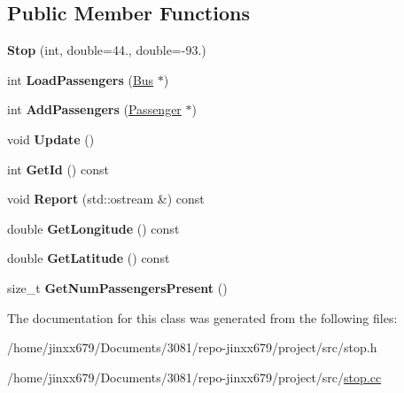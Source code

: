 \subsection*{Public Member Functions}
\begin{DoxyCompactItemize}
\item 
\mbox{\label{classStop_a59d881f072b1cf89512bb15a51ffc773}} 
{\bfseries Stop} (int, double=44., double=-\/93.)
\item 
\mbox{\label{classStop_a02c6dcba2b6de5fdd008cf623f19bf7c}} 
int {\bfseries Load\+Passengers} (\hyperlink{classBus}{Bus} $\ast$)
\item 
\mbox{\label{classStop_a20a8b6035679d92a7a838a03a102bcd1}} 
int {\bfseries Add\+Passengers} (\hyperlink{classPassenger}{Passenger} $\ast$)
\item 
\mbox{\label{classStop_aa373ae256ce6bc01ef13e876dfdec5bd}} 
void {\bfseries Update} ()
\item 
\mbox{\label{classStop_a2f3b845d5a338f197226c90696314904}} 
int {\bfseries Get\+Id} () const
\item 
\mbox{\label{classStop_a8e286b7cca2dce6977ebda6f01805d94}} 
void {\bfseries Report} (std\+::ostream \&) const
\item 
\mbox{\label{classStop_a89e650eecf57c03ba0a5222bf5f666f5}} 
double {\bfseries Get\+Longitude} () const
\item 
\mbox{\label{classStop_a20ad94a1876baf31d8cf0708aae4d21f}} 
double {\bfseries Get\+Latitude} () const
\item 
\mbox{\label{classStop_a38b567326cfc072113b305a77a9e1315}} 
size\+\_\+t {\bfseries Get\+Num\+Passengers\+Present} ()
\end{DoxyCompactItemize}


The documentation for this class was generated from the following files\+:\begin{DoxyCompactItemize}
\item 
/home/jinxx679/\+Documents/3081/repo-\/jinxx679/project/src/stop.\+h\item 
/home/jinxx679/\+Documents/3081/repo-\/jinxx679/project/src/\hyperlink{stop_8cc}{stop.\+cc}\end{DoxyCompactItemize}
